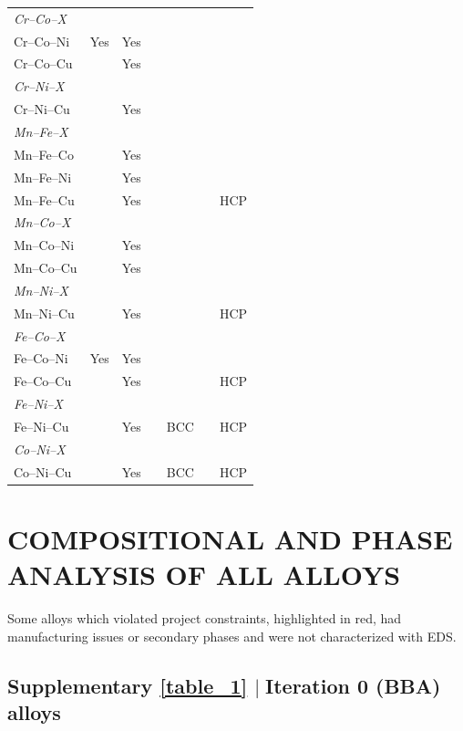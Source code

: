 \documentclass[final,5p,times,twocolumn]{elsarticle}
\begin{document}
\begin{longtable}{lcccccc}
\hline
\multicolumn{7}{l}{\textit{Cr--Co--X}} \\
Cr--Co--Ni  & Yes & Yes &        &     &     &     \\
Cr--Co--Cu  &     & Yes &        &     &     &     \\
\hline
\multicolumn{7}{l}{\textit{Cr--Ni--X}} \\
Cr--Ni--Cu  &     & Yes &        &     &     &     \\
\hline
\multicolumn{7}{l}{\textit{Mn--Fe--X}} \\
Mn--Fe--Co  &     & Yes &        &     &     &     \\
Mn--Fe--Ni  &     & Yes &        &     &     &     \\
Mn--Fe--Cu  &     & Yes &        &     &     & HCP \\
\hline
\multicolumn{7}{l}{\textit{Mn--Co--X}} \\
Mn--Co--Ni  &     & Yes &        &     &     &     \\
Mn--Co--Cu  &     & Yes &        &     &     &     \\
\hline
\multicolumn{7}{l}{\textit{Mn--Ni--X}} \\
Mn--Ni--Cu  &     & Yes &        &     &     & HCP \\
\hline
\multicolumn{7}{l}{\textit{Fe--Co--X}} \\
Fe--Co--Ni  & Yes & Yes &        &     &     &     \\
Fe--Co--Cu  &     & Yes &        &     &     & HCP \\
\hline
\multicolumn{7}{l}{\textit{Fe--Ni--X}} \\
Fe--Ni--Cu  &     & Yes &        & BCC &     & HCP \\
\hline
\multicolumn{7}{l}{\textit{Co--Ni--X}} \\
Co--Ni--Cu  &     & Yes &        & BCC &     & HCP \\
 
\end{longtable}
\normalsize

 

\newpage
\section{COMPOSITIONAL AND PHASE ANALYSIS OF ALL ALLOYS}
\label{s1_compositions}
    Some alloys which violated project constraints, highlighted in red, had manufacturing issues or secondary phases and were not characterized with EDS.

    \subsection{\texorpdfstring{\textbf{Supplementary \autoref{table_1}} \texorpdfstring{$\mid\;$}{Lg}Iteration 0 (BBA) alloys}{Supplementary Table 1 | Iteration 0 (BBA) alloys}}
\end{document}
